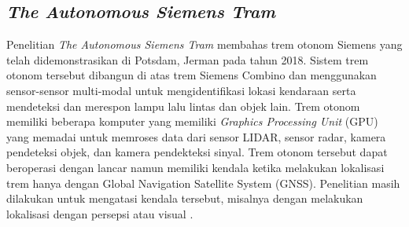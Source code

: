 \subsection{\textit{The Autonomous Siemens Tram}}
Penelitian \textit{The Autonomous Siemens Tram} membahas trem otonom Siemens
yang telah didemonstrasikan di Potsdam, Jerman pada tahun 2018. Sistem trem
otonom tersebut dibangun di atas trem Siemens Combino dan menggunakan
sensor-sensor multi-modal untuk mengidentifikasi lokasi kendaraan serta
mendeteksi dan merespon lampu lalu lintas dan objek lain. Trem otonom memiliki
beberapa komputer yang memiliki \textit{Graphics Processing Unit} (GPU) yang
memadai untuk memroses data dari sensor LIDAR, sensor radar, kamera pendeteksi
objek, dan kamera pendekteksi sinyal. Trem otonom tersebut dapat beroperasi
dengan lancar namun memiliki kendala ketika melakukan lokalisasi trem hanya
dengan Global Navigation Satellite System (GNSS). Penelitian masih dilakukan
untuk mengatasi kendala tersebut, misalnya dengan melakukan lokalisasi dengan
persepsi atau visual \parencite{at-palmer}.
